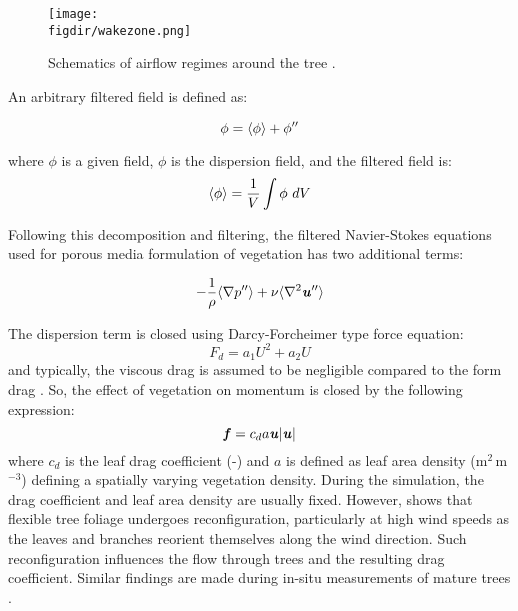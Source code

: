\begin{figure}[t]
	\centering
	\texttt{[image: \\figdir/wakezone.png]}
	\caption{Schematics of airflow regimes around the tree \citep{Cleugh1998,Judd1996}.}
	\label{fig:wakezone}
\end{figure}

An arbitrary filtered field is defined as:

\begin{equation}
\phi = \langle \phi \rangle + \phi''
\end{equation}

where $\phi$ is a given field,  $\phi$ is the dispersion field, and the filtered field is:
\begin{equation}
\eavg{\phi} = \frac{1}{V} \int \phi\ dV 
\end{equation}

Following this decomposition and filtering, the filtered Navier-Stokes equations used for porous media formulation of vegetation has two additional terms:

\begin{equation}
-\frac{1}{\rho}\langle \nabla p'' \rangle + \nu \langle \nabla^2 \textbf{\textit{u}}'' \rangle
\end{equation}

The dispersion term is closed using Darcy-Forcheimer type force equation: 
\begin{equation}
F_{d} =  a_1 U^2 + a_2 U 
\end{equation}
and typically, the viscous drag is assumed to be negligible compared to the form drag \citep{Raupach1981, Sanz2003}. So, the effect of vegetation on momentum is closed by the following expression:
\begin{equation}
\textbf{\textit{f}} = c_d a \textbf{\textit{u}}|\textbf{\textit{u}}|
\end{equation}
where $c_d$ is the leaf drag coefficient (-) and $a$ is defined as leaf area density (m$^2$\,m$^{-3}$) defining a spatially varying vegetation density. During the simulation, the drag coefficient and leaf area density are usually fixed. However, \cite{DeLangre2012} shows that flexible tree foliage undergoes reconfiguration, particularly at high wind speeds as the leaves and branches reorient themselves along the wind direction. Such reconfiguration influences the flow through trees and the resulting drag coefficient. Similar findings are made during in-situ measurements of mature trees \citep{Grant1998,Kane2006,Koizumi2016}.

